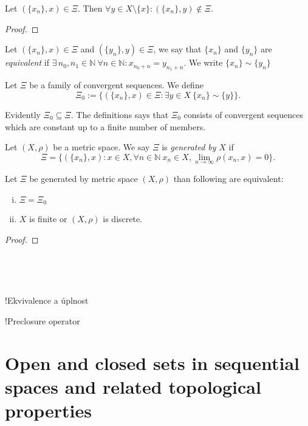 \begin{theorem} \label{th:onelim}
Let $(\{x_n\},x)\in\Xi$. Then $\forall y\in X\setminus\{x\}: (\{x_n\},y)\notin\Xi$.
\end{theorem} 

\begin{proof} 
\tbd
\end{proof}

\begin{define}\label{def:ekv}
Let $(\{x_n\},x)\in\Xi$ and $(\{y_n\},y)\in\Xi$, we say that $\{x_n\}$ and $\{y_n\}$ are {\sl equivalent} if $\exists\, n_0, n_1 \in \mathbb{N}\ \forall n \in \mathbb{N}: x_{n_0+n}=y_{n_1+n}$. We write $\{x_n\} \sim \{y_n\}$
\end{define}

\begin{define}\label{def:xi0}
Let $\Xi$ be a family of convergent sequences. We define
\[
	\Xi_0:=\{(\{x_n\},x)\in\Xi : \exists y\in X\ \{x_n\} \sim \{y\}\}.
\]
\end{define}
Evidently $\Xi_0\subseteq \Xi$. The definitions says that $\Xi_0$ consists of convergent sequences which are constant up to a finite number of members. 

\begin{define}\label{def:gen}
Let $(X,\rho)$ be a metric space. We say $\Xi$ is {\sl generated by} $X$ if 
\[
	\Xi=\{(\{x_n\},x): x\in X, \forall n\in \mathbb{N}\ x_n\in X, \lim_{n \to \infty} \rho(x_n,x)=0\}.
\]
\end{define}

\begin{theorem} \label{th:xieqxi0}
Let $\Xi$ be generated by metric space $(X,\rho)$ than following are equivalent:
\begin{enumerate}[(i)]
	\item $\Xi=\Xi_0$
	\item $X$ is finite or $(X,\rho)$ is discrete.
\end{enumerate}
\end{theorem} 

\begin{proof} 
\tbd
\end{proof}



\

\

!Ekvivalence a úplnost

!Preclosure operator


\section{Open and closed sets in sequential spaces and related topological properties}

